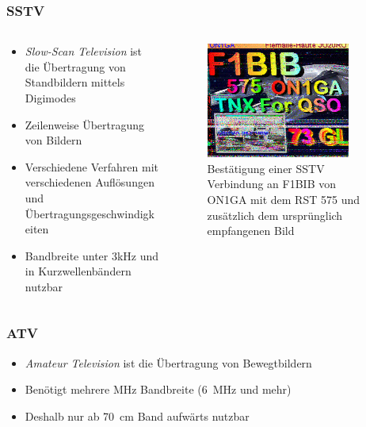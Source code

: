 \begin{frame}
\frametitle{SSTV}
\begin{columns}
    \begin{column}{0.48\textwidth}
    \begin{itemize}
  \item \emph{Slow-Scan Television} ist die Übertragung von Standbildern mittels Digimodes
  \item Zeilenweise Übertragung von Bildern
  \item Verschiedene Verfahren mit verschiedenen Auflösungen und Übertragungsgeschwindigkeiten
  \item Bandbreite unter 3kHz und in Kurzwellenbändern nutzbar
  \end{itemize}

    \end{column}
   \begin{column}{0.48\textwidth}
       
\begin{figure}
    \includegraphics[width=0.85\textwidth]{foto/84}
    \caption{\scriptsize Bestätigung einer SSTV Verbindung an F1BIB von ON1GA mit dem RST 575 und zusätzlich dem ursprünglich empfangenen Bild}
    \label{e_digimode_ssb_sstv}
\end{figure}

   \end{column}
\end{columns}

\end{frame}

\begin{frame}
\frametitle{ATV}
\begin{itemize}
  \item \emph{Amateur Television} ist die Übertragung von Bewegtbildern
  \item Benötigt mehrere MHz Bandbreite (\qty{6}{\mega\hertz} und mehr)
  \item Deshalb nur ab \qty{70}{\centi\metre} Band aufwärts nutzbar
  \end{itemize}
\end{frame}

